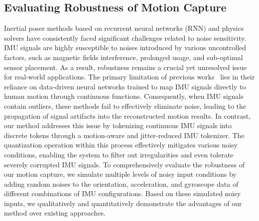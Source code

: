 \subsection{Evaluating Robustness of Motion Capture}
\label{sec:mocap_comparison}
Inertial poser methods based on recurrent neural networks (RNN) and physics solvers have consistently faced significant challenges related to noise sensitivity. IMU signals are highly susceptible to noises introduced by various uncontrolled factors, such as magnetic fields interference, prolonged usage, and sub-optimal sensor placement. As a result, robustness remains a crucial yet unresolved issue for real-world applications.
The primary limitation of previous works~\cite{huang2018DIP,TransPoseSIGGRAPH2021,PIPCVPR2022,TIP22,yi2024pnp} lies in their reliance on data-driven neural networks trained to map IMU signals directly to human motion through continuous functions. Consequently, when IMU signals contain outliers, these methods fail to effectively eliminate noise, leading to the propagation of signal artifacts into the reconstructed motion results.
In contrast, our method addresses this issue by tokenizing continuous IMU signals into discrete tokens through a motion-aware and jitter-reduced IMU tokenizer. The quantization operation within this process effectively mitigates various noisy conditions, enabling the system to filter out irregularities and even tolerate severely corrupted IMU signals.
To comprehensively evaluate the robustness of our motion capture, we simulate multiple levels of noisy input conditions by adding random noises to the orientation, acceleration, and gyroscope data of different combinations of IMU configurations. Based on these simulated noisy inputs, we qualitatively and quantitatively demonstrate the advantages of our method over existing approaches.


